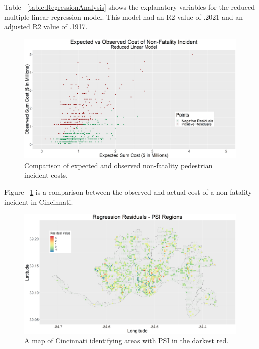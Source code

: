 \documentclass{llncs}
\begin{document}
Table ~\ref{table:RegressionAnalysis} shows the explanatory variables for the reduced multiple linear regression model. This model had an R2 value of .2021 and an adjusted R2 value of .1917. 

\FloatBarrier
\begin{figure}
\includegraphics[width=\textwidth, height=\textheight, keepaspectratio]{000LinearModelReduced.png}
\caption{Comparison of expected and observed non-fatality pedestrian incident costs.}
\label{figure:LinearModelReduced}

\end{figure}
\FloatBarrier

Figure ~\ref{figure:LinearModelReduced} is a comparison between the observed and actual cost of a non-fatality incident in Cincinnati.

\FloatBarrier
\begin{figure}
\includegraphics[width=\textwidth, height=\textheight, keepaspectratio]{000ResidualsPlot.png}
\caption{A map of Cincinnati identifying areas with PSI in the darkest red.}
\label{figure:ResidualsPlot}

\end{figure}
\FloatBarrier
\end{document}
